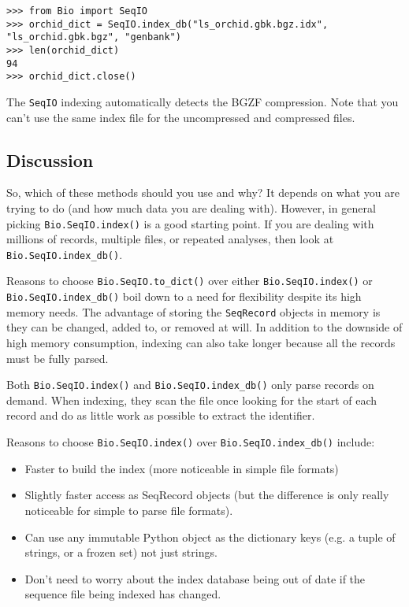 \begin{verbatim}
>>> from Bio import SeqIO
>>> orchid_dict = SeqIO.index_db("ls_orchid.gbk.bgz.idx", "ls_orchid.gbk.bgz", "genbank")
>>> len(orchid_dict)
94
>>> orchid_dict.close()
\end{verbatim}

The \verb|SeqIO| indexing automatically detects the BGZF compression. Note
that you can't use the same index file for the uncompressed and compressed files.

\subsection{Discussion}
\label{sec:SeqIO-indexing-discussion}

So, which of these methods should you use and why? It depends on what you are
trying to do (and how much data you are dealing with). However, in general
picking \verb|Bio.SeqIO.index()| is a good starting point. If you are dealing
with millions of records, multiple files, or repeated analyses, then look at
\verb|Bio.SeqIO.index_db()|.

Reasons to choose \verb|Bio.SeqIO.to_dict()| over either
\verb|Bio.SeqIO.index()| or \verb|Bio.SeqIO.index_db()| boil down to a need
for flexibility despite its high memory needs. The advantage of storing the
\verb|SeqRecord| objects in memory is they can be changed, added to, or
removed at will. In addition to the downside of high memory consumption,
indexing can also take longer because all the records must be fully parsed.

Both \verb|Bio.SeqIO.index()| and \verb|Bio.SeqIO.index_db()| only parse
records on demand. When indexing, they scan the file once looking for the
start of each record and do as little work as possible to extract the
identifier.

Reasons to choose \verb|Bio.SeqIO.index()| over \verb|Bio.SeqIO.index_db()|
include:
\begin{itemize}
\item Faster to build the index (more noticeable in simple file formats)
\item Slightly faster access as SeqRecord objects (but the difference is only
really noticeable for simple to parse file formats).
\item Can use any immutable Python object as the dictionary keys (e.g. a
tuple of strings, or a frozen set) not just strings.
\item Don't need to worry about the index database being out of date if the
sequence file being indexed has changed.
\end{itemize}


